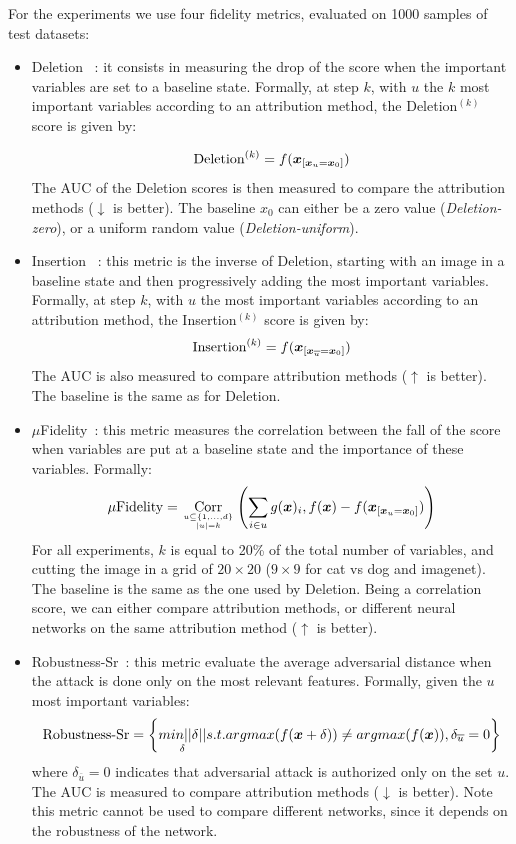For the experiments we use four fidelity metrics, evaluated on 1000 samples of test datasets: %
\begin{itemize}
    \item Deletion ~\cite{petsiuk18Rise}: it consists in measuring the drop of the score when the important variables are set to a baseline state. Formally, at step $k$, with $u$ the $k$ most important variables according to an attribution method, the Deletion$^{(k)}$ score is given by:

$$
\text{Deletion}^{(k)} = f(\bm{x}_{[\bm{x}_{u} = \bm{x}_0]})
$$
The AUC of the Deletion scores is then measured to compare the attribution methods ($\downarrow$ is better). The baseline $x_0$ can either be a zero value (\textit{Deletion-zero}), or a uniform random value (\textit{Deletion-uniform}).
\item Insertion ~\cite{petsiuk18Rise}: this metric is the inverse of Deletion, starting with an image in a baseline state and then progressively adding the most important variables. Formally, at step $k$, with $u$ the most important variables according to an attribution method, the Insertion$^{(k)}$ score is given by:
$$
\text{Insertion}^{(k)} = f(\bm{x}_{[\bm{x}_{\overline{u}} = \bm{x}_0]})
$$
The AUC is also measured to compare attribution methods ($\uparrow$ is better). The baseline is the same as for Deletion.
\item $\mu$Fidelity~\cite{Bhatt20muFidelity}: this metric measures the correlation between the fall of the score when variables are put at a baseline state and the importance of these variables. Formally:
$$
\mu\text{Fidelity} = \underset{u \subseteq \{1, ..., d\} \atop |u| = k}{\operatorname{Corr}}\left( \sum_{i \in u} g(\bm{x})_i  , f(\bm{x}) - f(\bm{x}_{[\bm{x}_{u} = \bm{x}_0]})\right)
$$
For all experiments, $k$ is equal to 20\% of the total number of variables, and cutting the image in a grid of $20\times 20$ ($9\times 9$ for cat vs dog and imagenet). The baseline is the same as the one used by Deletion. Being a correlation score, we can either compare attribution methods, or different neural networks on the same attribution method ($\uparrow$ is better).
\item Robustness-Sr~\cite{HsiehYLRKKH21}: this metric evaluate the average adversarial distance when the attack is done only on the most relevant features.  Formally, given the $u$ most important variables:
$$
\text{Robustness-Sr}=\left\{\underset{\delta}{min ||\delta||} s.t. argmax(f(\bm{x}+\delta)) \neq argmax(f(\bm{x})), \delta_{\overline{u}}=0 \right\}
$$
where $\delta_{\overline{u}}=0$ indicates that adversarial attack is authorized only on the set $u$. The AUC is measured to compare attribution methods ($\downarrow$ is better). Note this metric cannot be used to compare different networks, since it depends on the robustness of the network.
\end{itemize}

